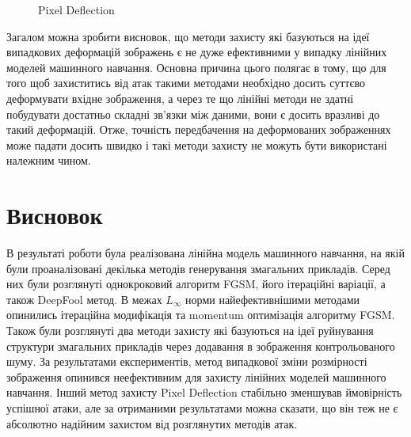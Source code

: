 \documentclass[a4paper,14pt]{extreport}
\begin{document}
\begin{figure}[!htb]
		\endminipage\hfill
		\caption{Pixel Deflection}
		\label{fig:pixeldeflection}
	\end{figure}
	
	Загалом можна зробити висновок, що методи захисту які базуються на ідеї випадкових деформацій зображень є не дуже ефективними у випадку лінійних моделей машинного навчання. Основна причина цього полягає в тому, що для того щоб захиститись від атак такими методами необхідно досить суттєво деформувати вхідне зображення, а через те що лінійні методи не здатні побудувати достатньо складні зв'язки між даними, вони є досить вразливі до такий деформацій. Отже, точність передбачення на деформованих зображеннях може падати досить швидко і такі методи захисту не можуть бути використані належним чином.

	\chapter{Висновок} 
	
	В результаті роботи була реалізована лінійна модель машинного навчання, на якій були проаналізовані декілька методів генерування змагальних прикладів. Серед них були розглянуті однокроковий алгоритм FGSM, його ітераційні варіації, а також DeepFool метод. В межах $L_{\infty}$ норми найефективнішими методами опинились ітераційна модифікація та momentum оптимізація алгоритму FGSM. Також були розглянуті два методи захисту які базуються на ідеї руйнування структури змагальних прикладів через додавання в зображення контрольованого шуму. За результатами експериментів, метод випадкової зміни розмірності зображення опинився неефективним для захисту лінійних моделей машинного навчання. Інший метод захисту Pixel Deflection стабільно зменшував ймовірність успішної атаки, але за отриманими результатами можна сказати, що він теж не є абсолютно надійним захистом від розглянутих методів атак.
	

	\nocite{goodfellow2014explaining}
	\nocite{kurakin2016adversarial}
	\nocite{moosavidezfooli2015deepfool}
	\nocite{dong2017boosting}
	\nocite{dong2019benchmarking}
	\nocite{yuan2017adversarial}
	\nocite{kurakin2018adversarial}
	\nocite{naseer2018local}
	\nocite{santhanam2018defending}
	\nocite{prakash2018deflecting}
	\printbibliography[title={Бібліографія}]
\end{document}
